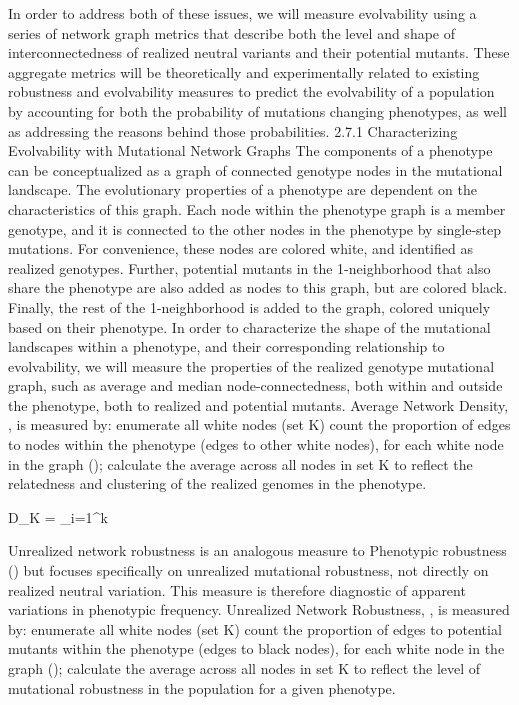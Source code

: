 In order to address both of these issues, we will measure evolvability using a series of network graph metrics that describe both the level and shape of interconnectedness of realized neutral variants and their potential mutants. These aggregate metrics will be theoretically and experimentally related to existing robustness and evolvability measures to predict the evolvability of a population by accounting for both the probability of mutations changing phenotypes, as well as addressing the reasons behind those probabilities.
2.7.1 Characterizing Evolvability with Mutational Network Graphs
The components of a phenotype can be conceptualized as a graph of connected genotype nodes in the mutational landscape. The evolutionary properties of a phenotype are dependent on the characteristics of this graph.  Each node within the phenotype graph is a member genotype, and it is connected to the other nodes in the phenotype by single-step mutations. For convenience, these nodes are colored white, and identified as realized genotypes. Further, potential mutants in the 1-neighborhood that also share the phenotype are also added as nodes to this graph, but are colored black. Finally, the rest of the 1-neighborhood is added to the graph, colored uniquely based on their phenotype. 
In order to characterize the shape of the mutational landscapes within a phenotype, and their corresponding relationship to evolvability, we will measure the properties of the realized genotype mutational graph, such as average and median node-connectedness, both within and outside the phenotype, both to realized and potential mutants. 
Average Network Density, , is measured by:
enumerate all white nodes (set K)
count the proportion of edges to nodes within the phenotype (edges to other white nodes), for each white node in the graph ();
calculate the average across all nodes in set K to reflect the relatedness and clustering of the realized genomes in the phenotype.

D_{K} =  { \sum_{i=1}^{k}} 


Unrealized network robustness is an analogous measure to Phenotypic robustness () but focuses specifically on unrealized mutational robustness, not directly on realized neutral variation. This measure is therefore diagnostic of apparent variations in phenotypic frequency. 
Unrealized Network Robustness, , is measured by:
enumerate all white nodes (set K)
count the proportion of edges to potential mutants within the phenotype (edges to black nodes), for each white node in the graph ();
calculate the average across all nodes in set K to reflect the level of mutational robustness in the population for a given phenotype.


